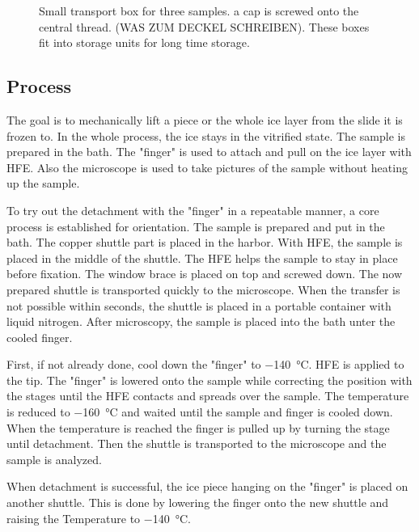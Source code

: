 \begin{figure}[hbt!]
	\centering
	
	\caption{Small transport box for three samples. a cap is screwed onto the central thread. (WAS ZUM DECKEL SCHREIBEN). These boxes fit into storage units for long time storage.}
	\label{fig:transportbox}
\end{figure}

\FloatBarrier

\subsection{Process}
\label{section:Process}

The goal is to mechanically lift a piece or the whole ice layer from the slide it is frozen to. In the whole process, the ice stays in the vitrified state. The sample is prepared in the bath. The "finger" is used to attach and pull on the ice layer with HFE. Also the microscope is used to take pictures of the sample without heating up the sample.

To try out the detachment with the "finger" in a repeatable manner, a core process is established for orientation. The sample is prepared and put in the bath. The copper shuttle part is placed in the harbor. With HFE, the sample is placed in the middle of the shuttle. The HFE helps the sample to stay in place before fixation. The window brace is placed on top and screwed down. The now prepared shuttle is transported quickly to the microscope. When the transfer is not possible within seconds, the shuttle is placed in a portable container with liquid nitrogen. After microscopy, the sample is placed into the bath unter the cooled finger. 

First, if not already done, cool down the "finger" to \SI{-140}{\degreeCelsius}. HFE is applied to the tip. The "finger" is lowered onto the sample while correcting the position with the stages until the HFE contacts and spreads over the sample. The temperature is reduced to \SI{-160}{\degreeCelsius} and waited until the sample and finger is cooled down. When the temperature is reached the finger is pulled up by turning the stage until detachment. Then the shuttle is transported to the microscope and the sample is analyzed. 

When detachment is successful, the ice piece hanging on the "finger" is placed on another shuttle. This is done by lowering the finger onto the new shuttle and raising the Temperature to \SI{-140}{\degreeCelsius}.

